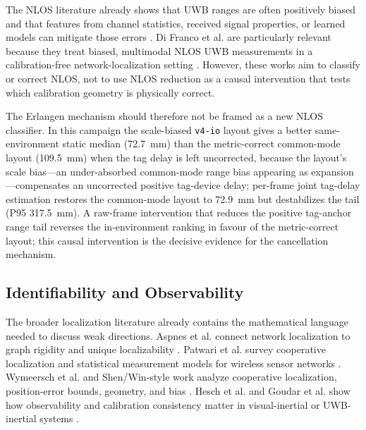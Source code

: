 \documentclass[11pt,a4paper]{article}
\begin{document}
The NLOS literature already shows that UWB ranges are often positively biased and that features from channel statistics, received signal properties, or learned models can mitigate those errors \citep{maran_2010_nlos_identification_and_mitigati,wymeersch_2012_a_machine_learning_approach,guven_2007_nlos_identification_and_weight,venkatesh_2007_non_line_of_sight_identification,meghani_2019_empirical_based_ranging_error,jeong_2023_hybrid_quantum_convolutional_neu,kong_2023_nlos_identification_for_uwb,sung_2023_accurate_indoor_positioning_for,yang_2024_uwb_nlos_identification_and}. Di Franco et al. are particularly relevant because they treat biased, multimodal NLOS UWB measurements in a calibration-free network-localization setting \citep{difranco_2017_calibration_free_network_localization_nlos_uwb}. However, these works aim to classify or correct NLOS, not to use NLOS reduction as a causal intervention that tests which calibration geometry is physically correct.

The Erlangen mechanism should therefore not be framed as a new NLOS classifier. In this campaign the scale-biased \texttt{v4-io} layout gives a better same-environment static median (72.7~mm) than the metric-correct common-mode layout (109.5~mm) when the tag delay is left uncorrected, because the layout's scale bias---an under-absorbed common-mode range bias appearing as expansion---compensates an uncorrected positive tag-device delay; per-frame joint tag-delay estimation restores the common-mode layout to 72.9~mm but destabilizes the tail (P95 317.5~mm). A raw-frame intervention that reduces the positive tag-anchor range tail reverses the in-environment ranking in favour of the metric-correct layout; this causal intervention is the decisive evidence for the cancellation mechanism.

\subsection{Identifiability and Observability}

The broader localization literature already contains the mathematical language needed to discuss weak directions. Aspnes et al. connect network localization to graph rigidity and unique localizability \citep{aspnes_2006_theory_network_localization}. Patwari et al. survey cooperative localization and statistical measurement models for wireless sensor networks \citep{patwari_2005_locating_the_nodes}. Wymeersch et al. and Shen/Win-style work analyze cooperative localization, position-error bounds, geometry, and bias \citep{wymeersch_2009_cooperative_localization_wireless_networks,joudarwin_2008_position_error_bound_uwb}. Hesch et al. and Goudar et al. show how observability and calibration consistency matter in visual-inertial or UWB-inertial systems \citep{hesch_2014_camera_imu_observability,goudar_2021_online_spatiotemporal_calibration_uwb_imu}.
\end{document}
